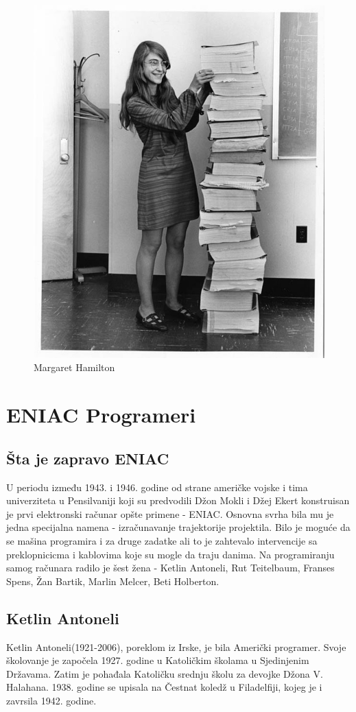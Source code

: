 \documentclass[a4paper,12pt]{article}
\begin{document}
    \begin{figure}[h]
    \centering
    \includegraphics[width = .4\textwidth]{margaret_hamilton5.jpg}
    \caption{Margaret Hamilton}
    \label{fig:my_label}
\end{figure}

\newpage
\section{ENIAC Programeri}

\subsection{Šta je zapravo ENIAC}
\begin{flushleft}

U periodu između 1943. i 1946. godine od strane američke vojske i tima univerziteta u Pensilvaniji koji su predvodili Džon Mokli i Džej Ekert konstruisan je prvi elektronski računar opšte primene - ENIAC. Osnovna svrha bila mu je jedna specijalna namena - izračunavanje trajektorije projektila. Bilo je moguće da se mašina programira i za druge zadatke ali to je zahtevalo intervencije sa preklopnicicma i kablovima koje su mogle da traju danima. Na programiranju samog računara radilo je šest žena - Ketlin Antoneli, Rut Teitelbaum, Franses Spens, Žan Bartik, Marlin Melcer, Beti Holberton.

\end{flushleft}

\subsection{Ketlin Antoneli}
\begin{flushleft}

Ketlin Antoneli(1921-2006), poreklom iz Irske, je bila Američki programer. Svoje školovanje je započela 1927. godine u Katoličkim školama u Sjedinjenim Državama. Zatim je pohađala Katoličku srednju školu za devojke Džona V. Halahana. 1938. godine se upisala na Čestnat koledž u Filadelfiji, kojeg je i zavrsila 1942. godine.

\end{flushleft}
\end{document}
